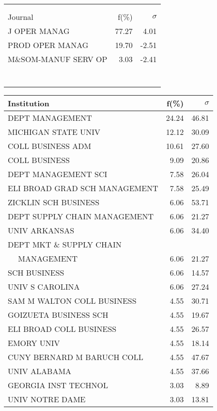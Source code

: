 \documentclass[a4paper,11pt]{report}
\begin{document}
\begin{landscape}
\begin{table}[!ht]
{\begin{tabular}{|l r r|}
 &  & \\
 &  & \\
\hline
\hline
Journal & f(\%) & $\sigma$\\
\hline
J OPER MANAG & 77.27 & 4.01\\
PROD OPER MANAG & 19.70 & -2.51\\
M\&SOM-MANUF SERV OP & 3.03 & -2.41\\
 &  & \\
 &  & \\
 &  & \\
 &  & \\
 &  & \\
 &  & \\
 &  & \\
\hline
\end{tabular}
}
{\scriptsize\begin{tabular}{|l r r|}
\hline
Institution & f(\%) & $\sigma$\\
\hline
DEPT MANAGEMENT & 24.24 & 46.81\\
MICHIGAN STATE UNIV & 12.12 & 30.09\\
COLL BUSINESS ADM & 10.61 & 27.60\\
COLL BUSINESS & 9.09 & 20.86\\
DEPT MANAGEMENT SCI & 7.58 & 26.04\\
ELI BROAD GRAD SCH MANAGEMENT & 7.58 & 25.49\\
ZICKLIN SCH BUSINESS & 6.06 & 53.71\\
DEPT SUPPLY CHAIN MANAGEMENT & 6.06 & 21.27\\
UNIV ARKANSAS & 6.06 & 34.40\\
DEPT MKT \& SUPPLY CHAIN &  & \\
$\quad$ MANAGEMENT & 6.06 & 21.27\\
SCH BUSINESS & 6.06 & 14.57\\
UNIV S CAROLINA & 6.06 & 27.24\\
SAM M WALTON COLL BUSINESS & 4.55 & 30.71\\
GOIZUETA BUSINESS SCH & 4.55 & 19.67\\
ELI BROAD COLL BUSINESS & 4.55 & 26.57\\
EMORY UNIV & 4.55 & 18.14\\
CUNY BERNARD M BARUCH COLL & 4.55 & 47.67\\
UNIV ALABAMA & 4.55 & 37.66\\
GEORGIA INST TECHNOL & 3.03 & 8.89\\
UNIV NOTRE DAME & 3.03 & 13.81\\
\hline
\hline

\end{tabular}}
\end{table}
\end{landscape}
\end{document}
